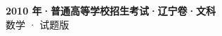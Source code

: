 \documentclass[zihao=-4, a4paper]{ctexart}
\begin{document}
\begin{center}
  {\Large\bfseries 2010 年·普通高等学校招生考试·辽宁卷·文科}\\[4pt]
  {\large 数学 · 试题版}
\end{center}
\medskip
{}

\end{document}
